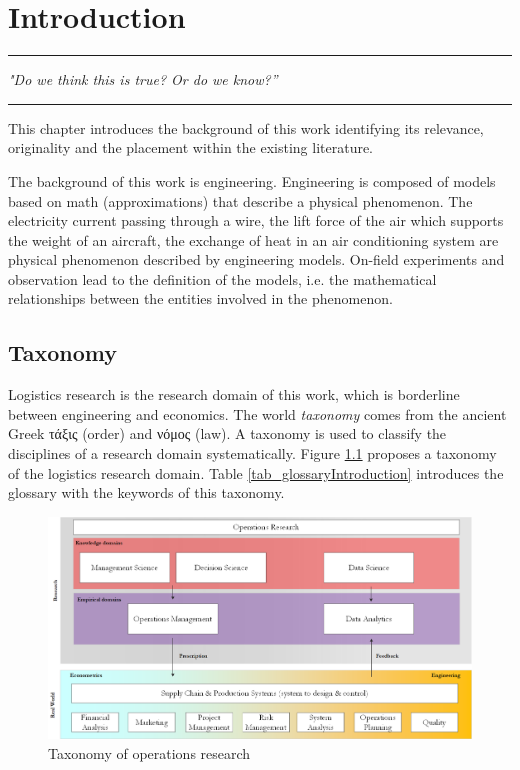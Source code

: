 \chapter{Introduction}

\noindent\rule{4cm}{0.4pt}\par
\textit{"Do we think this is true? Or do we know?”}\par
\noindent\rule{8cm}{0.4pt} \bigskip

This chapter introduces the background of this work identifying its relevance, originality and the placement within the existing literature.\par

The background of this work is engineering. Engineering is composed of models based on math (approximations) that describe a physical phenomenon. The electricity current passing through a wire, the lift force of the air which supports the weight of an aircraft, the exchange of heat in an air conditioning system are physical phenomenon described by engineering models. On-field experiments and observation lead to the definition of the models, i.e. the mathematical relationships between the entities involved in the phenomenon.

\section{Taxonomy} \label{secSupplyChainTaxonomy}

Logistics research is the research domain of this work, which is borderline between engineering and economics. The world \textit{taxonomy} comes from the ancient Greek \textgreek{τάξις} (order) and \textgreek{νόμος} (law). A taxonomy is used to classify the disciplines of a research domain systematically. Figure \ref{fig_operationsResearch} proposes a taxonomy of the logistics research domain. Table \ref{tab_glossaryIntroduction} introduces the glossary with the keywords of this taxonomy.

\begin{figure}[hbt!]
\centering
\includegraphics[width=1\textwidth]{SectionIntroduction/introduction_figures/fig_operationsResearch.png}
\captionsetup{type=figure}
\caption{Taxonomy of operations research}
\label{fig_operationsResearch}
\end{figure}


